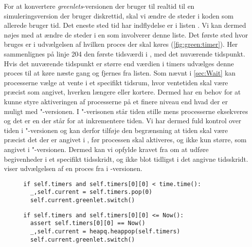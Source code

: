 For at konvertere \emph{greenlets}-versionen der bruger  til realtid til en simuleringsversion der bruger diskrettid, skal vi ændre de steder i koden som allerede bruger tid. 
Det eneste sted tid har indflydelse er i listen . 
Vi kan dermed nøjes med at ændre de steder i \sched en som involverer denne liste. 
Det første sted hvor  bruges er i udvælgelsen af hvilken proces der skal køres (\cref{fig:green:timer}). 
Her sammenlignes på linje 204 den første tidsværdi i , med det nuværende tidspunkt.
Hvis det nuværende tidspunkt er større end værdien i timers udvælges denne proces til at køre næste gang og fjernes fra listen.
Som nævnt i \cref{sec:Wait} kan processerne vælge at vente i et specifikt tidsrum, hvor ventetiden skal  være præcist som  angivet, hverken længere eller kortere. Dermed har  \sched en behov for at kunne  styre aktiveringen af processerne på et finere niveau end hvad der er muligt med "-versionen.  
I "-verisonen står tiden stille mens processerne eksekveres og det er \sched en der står for at inkrementere tiden. Vi har dermed fuld kontrol over tiden i "-versionen og kan derfor tilføje den begrænsning at tiden skal være præcist det der er angivet i , før processen skal aktiveres, og ikke kun større, som angivet i "-versionen. Dermed kan vi opfylde kravet fra \des om at udføre begivenheder i et specifikt tidsskridt, og ikke blot tidligst i det angivne tidsskridt.  viser udvælgelsen af en proces fra  i -versionen. 

\begin{figure}[hbtp]
\begin{minipage}[c]{\linewidth}
\begin{lstlisting}[firstnumber=204, label=fig:green:timer, caption=Udvælgelse af proces fra listen timers (fra scheduling.py)]
if self.timers and self.timers[0][0] < time.time():
  _,self.current = self.timers.pop(0)
  self.current.greenlet.switch()
\end{lstlisting}
\end{minipage}
\begin{minipage}[c]{\linewidth}
\begin{lstlisting}[firstnumber=124, label=fig:sim:timer, caption=Udvælgelse af proces fra listen timers (fra simulation.py)]
if self.timers and self.timers[0][0] <= Now():
  assert self.timers[0][0] == Now()
  _,self.current = heapq.heappop(self.timers)
  self.current.greenlet.switch()
\end{lstlisting}
\end{minipage}
\end{figure}

